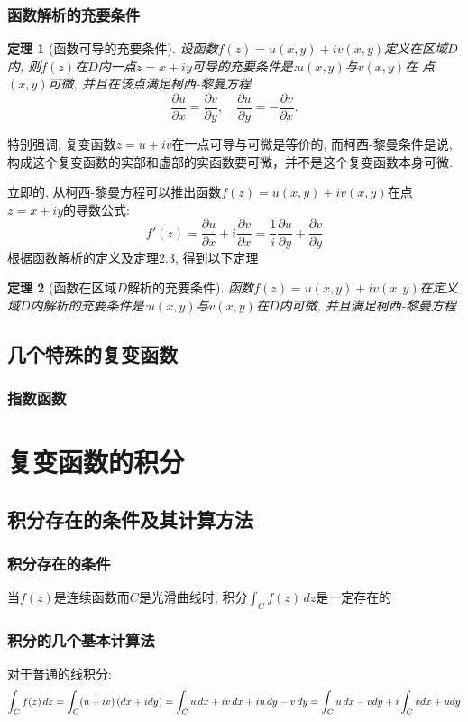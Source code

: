 \documentclass[12pt, a4paper, oneside]{ctexart}
\theoremstyle{plain}
\newtheorem{theorem}{定理}[section]
\theoremstyle{definition}
\theoremstyle{definition}
\begin{document}
\subsubsection{函数解析的充要条件}
\begin{theorem}[函数可导的充要条件]
设函数$f(z)=u(x,y)+iv(x,y)$定义在区域$D$内, 则$f(z)$在$D$内一点$z=x+iy$可导的充要条件是:$u(x,y)$与$v(x,y)$在
点$(x,y)$可微, 并且在该点满足柯西-黎曼方程
\[
    \frac{\partial u}{\partial x}=\frac{\partial v}{\partial y}, \quad\frac{\partial u}{\partial y} = -\frac{\partial v}{\partial x}.
\]
\end{theorem}
特别强调, 复变函数$z=u+iv$在一点可导与可微是等价的, 而柯西-黎曼条件是说, 构成这个复变函数的实部和虚部的实函数要可微，并不是这个复变函数本身可微.

立即的, 从柯西-黎曼方程可以推出函数$f(z)=u(x,y)+iv(x,y)$在点$z=x+iy$的导数公式:
\[
    f'(z)=\frac{\partial u}{\partial x}+i\frac{\partial v}{\partial x}=\frac{1}{i}\frac{\partial u}{\partial y}+\frac{\partial v}{\partial y}
\]
根据函数解析的定义及定理2.3, 得到以下定理
\begin{theorem}[函数在区域$D$解析的充要条件]
    函数$f(z)=u(x,y)+iv(x,y)$在定义域$D$内解析的充要条件是:$u(x,y)$与$v(x,y)$在$D$内可微, 并且满足柯西-黎曼方程
\end{theorem}
\subsection{几个特殊的复变函数}
\subsubsection{指数函数}
\section{复变函数的积分}
\subsection{积分存在的条件及其计算方法}
\subsubsection{积分存在的条件}
当$f(z)$是连续函数而$C$是光滑曲线时, 积分$\int_{C}f(z)  \,dz $是一定存在的
\subsubsection{积分的几个基本计算法}
对于普通的线积分:
\[
    \int_{C}f(z)\,dz=\int_{C}(u+iv)\,(dx+idy)=\int_{C}u\,dx+iv\,dx+iu\,dy-v\,dy\\
    =\int_{C}u\,dx-vdy+i\int_{C}vdx+udy
\]
\end{document}
